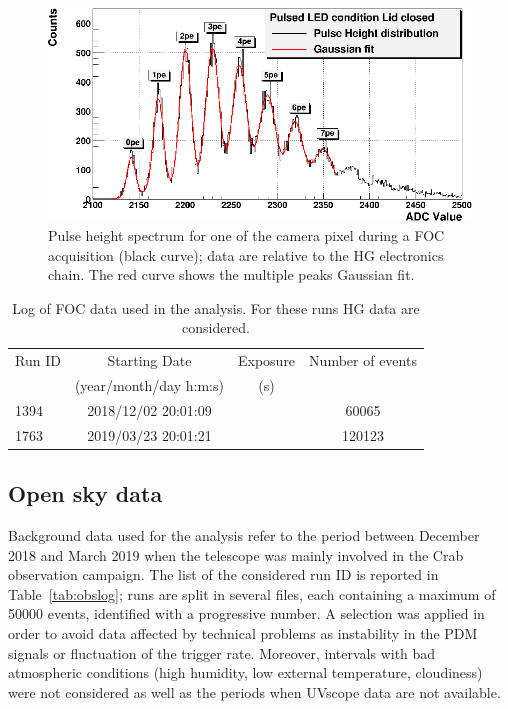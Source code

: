 \begin{figure}[ht!!]
\centering
\includegraphics[angle=0, width=12.5cm]{Figure/PIXEL60_PDM20_HG_DICEMBRE_2018.eps}
\vspace{0.5cm}
\caption{ Pulse height spectrum for one of the camera pixel during a FOC acquisition (black curve); data are relative to the HG electronics chain. The red curve shows the multiple peaks Gaussian fit.}
\label{fig:FOC}
\end{figure}

\begin{table}[htbp!!]
\centering
\caption{Log of FOC data used in the analysis. For these runs HG data are considered. }
\begin{tabular}{lccc}
\hline\hline
Run ID & Starting Date &  Exposure & Number of events \\
               & (year/month/day h:m:s) & (s)   \\
\hline     
1394 & 2018/12/02 20:01:09  &  & 60065     \\
1763 & 2019/03/23 20:01:21  &  & 120123    \\ 
\hline\hline
\end{tabular}
\label{tab:FOC}
\end{table}

\subsection{Open sky data} 
\label{subs:skydata}

Background data used for the analysis refer to the period between December 2018 and March 2019 when the telescope was mainly involved in the Crab observation campaign. The list of the considered run ID is reported in Table~\ref{tab:obslog}; runs are split in several files, each containing a maximum of 50000 events, identified with a progressive number.
A selection was applied in order to avoid data affected by technical problems as instability in the PDM signals or fluctuation of the trigger rate. Moreover, intervals with bad atmospheric conditions 
(high humidity, low external temperature, cloudiness) were not considered as well as the periods when UVscope data are not available.


